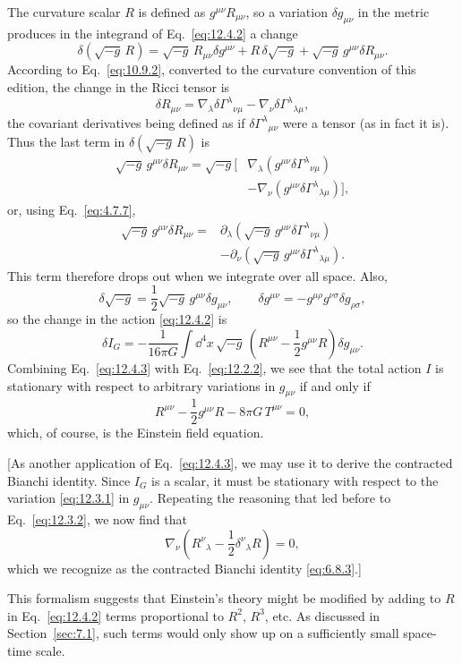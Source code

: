 The curvature scalar \(R\) is defined as \(g^{\mu\nu}R_{\mu\nu}\), so a
variation \(\delta g_{\mu\nu}\) in the metric produces in the integrand of
Eq.~\eqref{eq:12.4.2} a change
\[
  \delta\!\left(\sqrt{-g}\,R\right)
  =
  \sqrt{-g}\,R_{\mu\nu}\delta g^{\mu\nu}
  +R\,\delta\sqrt{-g}
  +\sqrt{-g}\,g^{\mu\nu}\delta R_{\mu\nu}.
\]
According to Eq.~\eqref{eq:10.9.2}, converted to the curvature convention of
this edition, the change in the Ricci tensor is
\[
  \delta R_{\mu\nu}
  =
  \nabla_\lambda\delta\Gamma^\lambda{}_{\nu\mu}
  -\nabla_\nu\delta\Gamma^\lambda{}_{\lambda\mu},
\]
the covariant derivatives being defined as if
\(\delta\Gamma^\lambda{}_{\mu\nu}\) were a tensor (as in fact it is). Thus the
last term in \(\delta(\sqrt{-g}\,R)\) is
\[
\begin{aligned}
  \sqrt{-g}\,g^{\mu\nu}\delta R_{\mu\nu}
  =\sqrt{-g}\big[
    &\nabla_\lambda(g^{\mu\nu}\delta\Gamma^\lambda{}_{\nu\mu})
    \\
    &-\nabla_\nu(g^{\mu\nu}\delta\Gamma^\lambda{}_{\lambda\mu})
  \big],
\end{aligned}
\]
or, using Eq.~\eqref{eq:4.7.7},
\[
\begin{aligned}
  \sqrt{-g}\,g^{\mu\nu}\delta R_{\mu\nu}
  ={}&
  \partial_\lambda\!\left(
    \sqrt{-g}\,g^{\mu\nu}\delta\Gamma^\lambda{}_{\nu\mu}
  \right)
  \\
  &-\partial_\nu\!\left(
    \sqrt{-g}\,g^{\mu\nu}\delta\Gamma^\lambda{}_{\lambda\mu}
  \right).
\end{aligned}
\]
This term therefore drops out when we integrate over all space. Also,
\[
  \delta\sqrt{-g}
  =
  \frac12\sqrt{-g}\,g^{\mu\nu}\delta g_{\mu\nu},
  \qquad
  \delta g^{\mu\nu}
  =
  -g^{\mu\rho}g^{\nu\sigma}\delta g_{\rho\sigma},
\]
so the change in the action \eqref{eq:12.4.2} is
\begin{equation}
  \delta I_G
  =
  -\frac1{16\pi G}\int\dd^4x\,\sqrt{-g}\,
  \left(R^{\mu\nu}-\frac12g^{\mu\nu}R\right)
  \delta g_{\mu\nu}.
  \tag{12.4.3}\label{eq:12.4.3}
\end{equation}
Combining Eq.~\eqref{eq:12.4.3} with Eq.~\eqref{eq:12.2.2}, we see that the
total action \(I\) is stationary with respect to arbitrary variations in
\(g_{\mu\nu}\) if and only if
\[
  R^{\mu\nu}-\frac12g^{\mu\nu}R-8\pi G\,T^{\mu\nu}=0,
\]
which, of course, is the Einstein field equation.

[As another application of Eq.~\eqref{eq:12.4.3}, we may use it to derive the
contracted Bianchi identity. Since \(I_G\) is a scalar, it must be stationary
with respect to the variation \eqref{eq:12.3.1} in \(g_{\mu\nu}\). Repeating
the reasoning that led before to Eq.~\eqref{eq:12.3.2}, we now find that
\[
  \nabla_\nu
  \left(R^\nu{}_\lambda-\frac12\delta^\nu{}_\lambda R\right)=0,
\]
which we recognize as the contracted Bianchi identity \eqref{eq:6.8.3}.]

This formalism suggests that Einstein's theory might be modified by adding to
\(R\) in Eq.~\eqref{eq:12.4.2} terms proportional to \(R^2\), \(R^3\), etc.
As discussed in Section~\ref{sec:7.1}, such terms would only show up on a
sufficiently small space-time scale.
